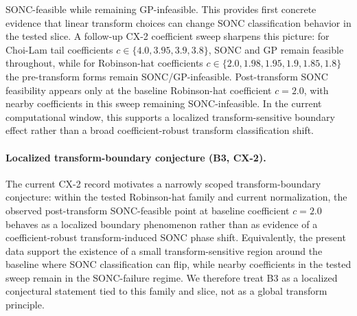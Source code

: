 \documentclass{article}
\begin{document}
SONC-feasible while remaining GP-infeasible. This provides first concrete evidence that linear
transform choices can change SONC classification behavior in the tested slice.
A follow-up CX-2 coefficient sweep sharpens this picture: for Choi-Lam tail coefficients
$c\in\{4.0,3.95,3.9,3.8\}$, SONC and GP remain feasible throughout, while for Robinson-hat
coefficients $c\in\{2.0,1.98,1.95,1.9,1.85,1.8\}$ the pre-transform forms remain SONC/GP-infeasible.
Post-transform SONC feasibility appears only at the baseline Robinson-hat coefficient $c=2.0$,
with nearby coefficients in this sweep remaining SONC-infeasible. In the current computational
window, this supports a localized transform-sensitive boundary effect rather than a broad
coefficient-robust transform classification shift.

\paragraph{Localized transform-boundary conjecture (B3, CX-2).}
\begin{sloppypar}
The current CX-2 record motivates a narrowly scoped transform-boundary conjecture: within the
tested Robinson-hat family and current normalization, the observed post-transform SONC-feasible
point at baseline coefficient $c=2.0$ behaves as a localized boundary phenomenon rather than as
evidence of a coefficient-robust transform-induced SONC phase shift. Equivalently, the present
data support the existence of a small transform-sensitive region around the baseline where SONC
classification can flip, while nearby coefficients in the tested sweep remain in the SONC-failure
regime. We therefore treat B3 as a localized conjectural statement tied to this family and slice,
not as a global transform principle.
\end{sloppypar}
\end{document}
